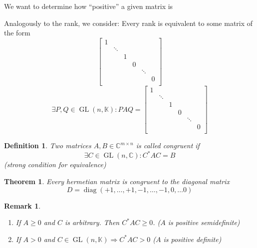 \documentclass[a4paper,landscape,twocolumn]{article}
\newtheorem{theorem}{Theorem}
\newtheorem{defi}{Definition}
\newtheorem{rem}{Remark}
\begin{document}
We want to determine how \enquote{positive} a given matrix is

Analogously to the rank, we consider:
Every rank is equivalent to some matrix of the form
\[
  \begin{bmatrix}
    1 &        &   &   &        &  \\
      & \ddots &   &   &        &  \\
      &        & 1 &   &        &  \\
      &        &   & 0 &        &  \\
      &        &   &   & \ddots &  \\
      &        &   &   &        & 0 \\
  \end{bmatrix}
\]
\[
  \exists P,Q \in \operatorname{GL}(n,\mathbb K): PAQ =
  \begin{bmatrix}
    1 &        &   &   &        &  \\
      & \ddots &   &   &        &  \\
      &        & 1 &   &        &  \\
      &        &   & 0 &        &  \\
      &        &   &   & \ddots &  \\
      &        &   &   &        & 0 \\
  \end{bmatrix}
\]

\begin{defi}
  \label{def-8.23}
  Two matrices $A,B \in \mathbb C^{m\times n}$ is called congruent if
  \[ \exists C \in \operatorname{GL}(n, \mathbb C): C^* AC = B \]
  (strong condition for equivalence)
\end{defi}
\begin{theorem}
  \label{satz-8.24}
  Every hermetian matrix is congruent to the diagonal matrix
  \[ D = \operatorname{diag}(+1, \ldots, +1, -1, \ldots, -1, 0, \ldots 0) \]
\end{theorem}

\begin{rem}
  \label{ue-8.26}
  \begin{enumerate}
    \item If $A \geq 0$ and $C$ is arbitrary. Then $C^* A C \geq 0$. ($A$ is positive semidefinite)
    \item
      If $A > 0$ and $C \in \operatorname{GL}(n,\mathbb K) \Rightarrow C^* A C > 0$
      ($A$ is positive definite)
  \end{enumerate}
\end{rem}
\end{document}
